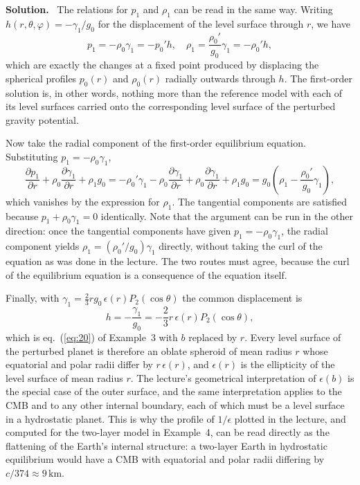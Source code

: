 \documentclass[a4paper,12pt]{paper}
\newenvironment{solution}{\par\noindent\textbf{Solution.}\ }{\par\medskip}
\begin{document}
\begin{solution}
The relations for $p_{1}$ and $\rho_{1}$ can be read in the same way. Writing
$h(r,\theta,\varphi)=-\gamma_{1}/g_{0}$ for the displacement of the level surface through $r$, we have
\begin{equation}
p_{1}=-\rho_{0}\gamma_{1}=-p_{0}'h,\quad \rho_{1}=\frac{\rho_{0}'}{g_{0}}\gamma_{1}=-\rho_{0}'h,
\label{eq:34}
\end{equation}
which are exactly the changes at a fixed point produced by displacing the spherical profiles
$p_{0}(r)$ and $\rho_{0}(r)$ radially outwards through $h$. The first-order solution is, in other
words, nothing more than the reference model with each of its level surfaces carried onto the
corresponding level surface of the perturbed gravity potential.

Now take the radial component of the first-order equilibrium equation. Substituting
$p_{1}=-\rho_{0}\gamma_{1}$,
\begin{equation}
\frac{\partial p_{1}}{\partial r}+\rho_{0}\frac{\partial\gamma_{1}}{\partial r}+\rho_{1}g_{0}
=-\rho_{0}'\gamma_{1}-\rho_{0}\frac{\partial\gamma_{1}}{\partial r}+\rho_{0}\frac{\partial\gamma_{1}}{\partial r}+\rho_{1}g_{0}
=g_{0}\left(\rho_{1}-\frac{\rho_{0}'}{g_{0}}\gamma_{1}\right),
\label{eq:35}
\end{equation}
which vanishes by the expression for $\rho_{1}$. The tangential components are satisfied because
$p_{1}+\rho_{0}\gamma_{1}=0$ identically. Note that the argument can be run in the other direction:
once the tangential components have given $p_{1}=-\rho_{0}\gamma_{1}$, the radial component yields
$\rho_{1}=(\rho_{0}'/g_{0})\gamma_{1}$ directly, without taking the curl of the equation as was done in
the lecture. The two routes must agree, because the curl of the equilibrium equation is a
consequence of the equation itself.

Finally, with $\gamma_{1}=\frac{2}{3}rg_{0}\,\epsilon(r)P_{2}(\cos\theta)$ the common displacement is
\begin{equation}
h=-\frac{\gamma_{1}}{g_{0}}=-\frac{2}{3}r\,\epsilon(r)P_{2}(\cos\theta),
\label{eq:36}
\end{equation}
which is eq.~(\ref{eq:20}) of Example~3 with $b$ replaced by $r$. Every level surface of the
perturbed planet is therefore an oblate spheroid of mean radius $r$ whose equatorial and polar
radii differ by $r\,\epsilon(r)$, and $\epsilon(r)$ is the ellipticity of the level surface of mean radius
$r$. The lecture's geometrical interpretation of $\epsilon(b)$ is the special case of the outer
surface, and the same interpretation applies to the CMB and to any other internal boundary,
each of which must be a level surface in a hydrostatic planet. This is why the profile of
$1/\epsilon$ plotted in the lecture, and computed for the two-layer model in Example~4, can be
read directly as the flattening of the Earth's internal structure: a two-layer Earth in
hydrostatic equilibrium would have a CMB with equatorial and polar radii differing by
$c/374\approx9\,\mathrm{km}$.
\end{solution}
\end{document}
